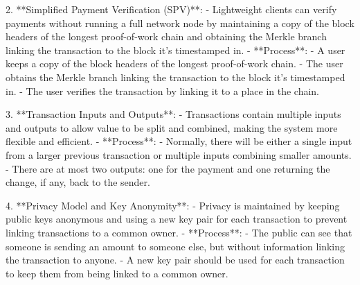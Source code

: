 \documentclass{article}
\begin{document}
2. **Simplified Payment Verification (SPV)**:
   - Lightweight clients can verify payments without running a full network node by maintaining a copy of the block headers of the longest proof-of-work chain and obtaining the Merkle branch linking the transaction to the block it's timestamped in.
   - **Process**:
     - A user keeps a copy of the block headers of the longest proof-of-work chain.
     - The user obtains the Merkle branch linking the transaction to the block it's timestamped in.
     - The user verifies the transaction by linking it to a place in the chain.

3. **Transaction Inputs and Outputs**:
   - Transactions contain multiple inputs and outputs to allow value to be split and combined, making the system more flexible and efficient.
   - **Process**:
     - Normally, there will be either a single input from a larger previous transaction or multiple inputs combining smaller amounts.
     - There are at most two outputs: one for the payment and one returning the change, if any, back to the sender.

4. **Privacy Model and Key Anonymity**:
   - Privacy is maintained by keeping public keys anonymous and using a new key pair for each transaction to prevent linking transactions to a common owner.
   - **Process**:
     - The public can see that someone is sending an amount to someone else, but without information linking the transaction to anyone.
     - A new key pair should be used for each transaction to keep them from being linked to a common owner.
\end{document}
